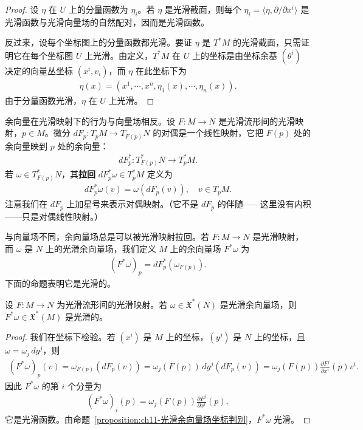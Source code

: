 \documentclass[../../main.tex]{subfiles}
\begin{document}
\begin{proof}
设 $\eta$ 在 $U$ 上的分量函数为 $\eta_i$。若 $\eta$ 是光滑截面，则每个 $\eta_i=\langle\eta,\partial/\partial x^i\rangle$ 是光滑函数与光滑向量场的自然配对，因而是光滑函数。

反过来，设每个坐标图上的分量函数都光滑。要证 $\eta$ 是 $T^*M$ 的光滑截面，只需证明它在每个坐标图 $U$ 上光滑。由定义，$T^*M$ 在 $U$ 上的坐标是由坐标余基 $(\theta^i)$ 决定的向量丛坐标 $(x^i, v_i)$，而 $\eta$ 在此坐标下为
\begin{align*}
\eta(x)=(x^1,\cdots ,x^n,\eta_1(x),\cdots ,\eta_n(x)).
\end{align*}
由于分量函数光滑，$\eta$ 在 $U$ 上光滑。
\end{proof}

余向量在光滑映射下的行为与向量场相反。设 $F\colon M\to N$ 是光滑流形间的光滑映射，$p\in M$。微分 $dF_p\colon T_pM\to T_{F(p)}N$ 的对偶是一个线性映射，它把 $F(p)$ 处的余向量映到 $p$ 处的余向量：
\begin{align*}
dF_p^*\colon T_{F(p)}^*N\to T_p^*M.
\end{align*}
若 $\omega\in T_{F(p)}^*N$，其\textbf{拉回} $dF_p^*\omega\in T_p^*M$ 定义为
\begin{align}
dF_p^*\omega(v)=\omega(dF_p(v)),\quad v\in T_pM.\label{align:ch11-余向量拉回}
\end{align}
注意我们在 $dF_p$ 上加星号来表示对偶映射。（它不是 $dF_p$ 的伴随——这里没有内积——只是对偶线性映射。）

与向量场不同，余向量场总是可以被光滑映射拉回。若 $F\colon M\to N$ 是光滑映射，而 $\omega$ 是 $N$ 上的光滑余向量场，我们定义 $M$ 上的余向量场 $F^*\omega$ 为
\begin{align}
(F^*\omega)_p=dF_p^*(\omega_{F(p)}).\label{align:ch11-余向量场拉回}
\end{align}
下面的命题表明它是光滑的。

\begin{proposition}\label{proposition:ch11-拉回余向量场光滑}
设 $F\colon M\to N$ 为光滑流形间的光滑映射。若 $\omega\in\mathfrak X^*(N)$ 是光滑余向量场，则 $F^*\omega\in\mathfrak X^*(M)$ 是光滑的。
\end{proposition}

\begin{proof}
我们在坐标下检验。若 $(x^i)$ 是 $M$ 上的坐标，$(y^j)$ 是 $N$ 上的坐标，且 $\omega=\omega_j\,dy^j$，则
\begin{align*}
(F^*\omega)_p(v)=\omega_{F(p)}(dF_p(v))=\omega_j(F(p))\,dy^j(dF_p(v))=\omega_j(F(p))\frac{\partial F^j}{\partial x^i}(p)v^i.
\end{align*}
因此 $F^*\omega$ 的第 $i$ 个分量为
\begin{align*}
(F^*\omega)_i(p)=\omega_j(F(p))\frac{\partial F^j}{\partial x^i}(p),
\end{align*}
它是光滑函数。由命题~\ref{proposition:ch11-光滑余向量场坐标判别}，$F^*\omega$ 光滑。
\end{proof}
\end{document}
